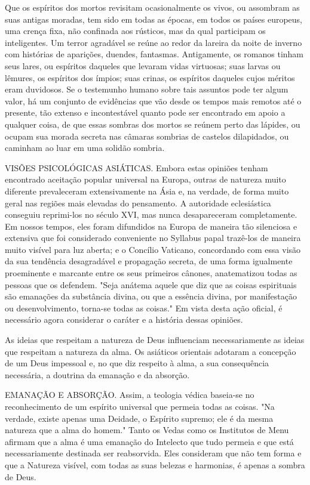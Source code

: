 \documentclass[11pt,a5paper,twoside,openany]{book}
\begin{document}
Que os espíritos dos mortos revisitam ocasionalmente os vivos, ou assombram as suas antigas moradas, tem sido em todas as épocas, em todos os países europeus, uma crença fixa, não confinada aos rústicos, mas da qual participam os inteligentes. Um terror agradável se reúne ao redor da lareira da noite de inverno com histórias de aparições, duendes, fantasmas. Antigamente, os romanos tinham seus lares, ou espíritos daqueles que levaram vidas virtuosas; suas larvas ou lêmures, os espíritos dos ímpios; suas crinas, os espíritos daqueles cujos méritos eram duvidosos. Se o testemunho humano sobre tais assuntos pode ter algum valor, há um conjunto de evidências que vão desde os tempos mais remotos até o presente, tão extenso e incontestável quanto pode ser encontrado em apoio a qualquer coisa, de que essas sombras dos mortos se reúnem perto das lápides, ou ocupam sua morada secreta nas câmaras sombrias de castelos dilapidados, ou caminham ao luar em uma solidão sombria.

VISÕES PSICOLÓGICAS ASIÁTICAS. Embora estas opiniões tenham encontrado aceitação popular universal na Europa, outras de natureza muito diferente prevaleceram extensivamente na Ásia e, na verdade, de forma muito geral nas regiões mais elevadas do pensamento. A autoridade eclesiástica conseguiu reprimi-los no século XVI, mas nunca desapareceram completamente. Em nossos tempos, eles foram difundidos na Europa de maneira tão silenciosa e extensiva que foi considerado conveniente no Syllabus papal trazê-los de maneira muito visível para luz aberta; e o Concílio Vaticano, concordando com essa visão da sua tendência desagradável e propagação secreta, de uma forma igualmente proeminente e marcante entre os seus primeiros cânones, anatematizou todas as pessoas que os defendem. "Seja anátema aquele que diz que as coisas espirituais são emanações da substância divina, ou que a essência divina, por manifestação ou desenvolvimento, torna-se todas as coisas." Em vista desta ação oficial, é necessário agora considerar o caráter e a história dessas opiniões.

As ideias que respeitam a natureza de Deus influenciam necessariamente as ideias que respeitam a natureza da alma. Os asiáticos orientais adotaram a concepção de um Deus impessoal e, no que diz respeito à alma, a sua consequência necessária, a doutrina da emanação e da absorção.

EMANAÇÃO E ABSORÇÃO. Assim, a teologia védica baseia-se no reconhecimento de um espírito universal que permeia todas as coisas. "Na verdade, existe apenas uma Deidade, o Espírito supremo; ele é da mesma natureza que a alma do homem." Tanto os Vedas como os Institutos de Menu afirmam que a alma é uma emanação do Intelecto que tudo permeia e que está necessariamente destinada ser reabsorvida. Eles consideram que não tem forma e que a Natureza visível, com todas as suas belezas e harmonias, é apenas a sombra de Deus.
\end{document}
